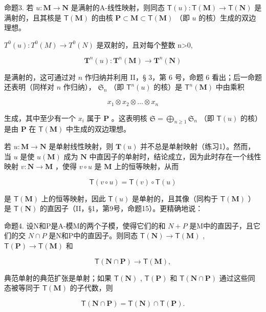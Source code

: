 命题3. 若 \(u: \mathbf{M} \to \mathbf{N}\) 是满射的A-线性映射，则同态 \(\mathsf{T}(u): \mathsf{T}(\mathbf{M}) \to \mathsf{T}(\mathbf{N})\) 是满射的，且其核是 \(\mathsf{T}(\mathbf{M})\) 的由核 \(\mathbf{P} \subset \mathbf{M} \subset \mathsf{T}(\mathbf{M})\) （即 \(u\) 的核）生成的双边理想。

\(T^{0}(u):T^{0}(M)\rightarrow T^{0}(N)\) 是双射的，且对每个整数 n\textgreater0,

\[
\mathbf {T} ^ {n} (u): \mathbf {T} ^ {n} (\mathbf {M}) \rightarrow \mathbf {T} ^ {n} (\mathbf {N})
\]

是满射的，这可通过对 \(n\) 作归纳并利用 II，§ 3，第 6 号，命题 6 看出；后一命题还表明（同样对 \(n\) 作归纳）， \(\mathfrak{S}_n\) （即 \(\mathsf{T}^n(u)\) 的核）是 \(\mathsf{T}^n(\mathbf{M})\) 中由乘积

\[
x _ {1} \otimes x _ {2} \otimes \dots \otimes x _ {n}
\]

生成，其中至少有一个 \(x_{i}\) 属于 \(\mathbf{P}\) 。这表明核 \(\mathfrak{S} = \bigoplus_{n\geqslant 1}\mathfrak{S}_n\) （即 \(\mathsf{T}(u)\) 的核）是由 \(\mathbf{P}\) 在 \(\mathsf{T}(\mathbf{M})\) 中生成的双边理想。

若 \(u: \mathbf{M} \to \mathbf{N}\) 是单射线性映射，则 \(\mathbf{T}(u)\) 并不总是单射映射（练习1）。然而，当 \(u\) 是使 \(u(\mathbf{M})\) 成为 \(\mathbf{N}\) 中直因子的单射时，结论成立，因为此时存在一个线性映射 \(v: \mathbf{N} \to \mathbf{M}\) ，使得 \(v \circ u\) 是 \(\mathbf{M}\) 上的恒等映射，从而

\[
\mathsf {T} (v \circ u) = \mathsf {T} (v) \circ \mathsf {T} (u)
\]

是 \(\mathsf{T}(\mathbf{M})\) 上的恒等映射，因此 \(\mathsf{T}(u)\) 是单射的，且其像（同构于 \(\mathsf{T}(\mathbf{M})\) ）是 \(\mathsf{T}(\mathbf{N})\) 的直因子（II，§1，第9号，命题15）。更精确地说：

命题4. 设N和P是A-模M的两个子模，使得它们的和 \(N + P\) 是M中的直因子，且它们的交 \(N \cap P\) 是N和P中的直因子。则同态 \(\mathsf{T}(\mathbf{N}) \to \mathsf{T}(\mathbf{M})\) , \(\mathsf{T}(\mathbf{P}) \to \mathsf{T}(\mathbf{M})\) 和

\[
\mathsf {T} (\mathbf {N} \cap \mathbf {P}) \rightarrow \mathsf {T} (\mathbf {M}),
\]

典范单射的典范扩张是单射；如果 \(\mathsf{T}(\mathbf{N})\) , \(\mathsf{T}(\mathbf{P})\) 和 \(\mathsf{T}(\mathbf{N} \cap \mathbf{P})\) 通过这些同态被等同于 \(\mathsf{T}(\mathbf{M})\) 的子代数，则

\[
\mathsf {T} (\mathbf {N} \cap \mathbf {P}) = \mathsf {T} (\mathbf {N}) \cap \mathsf {T} (\mathbf {P}).\tag{5}
\]

